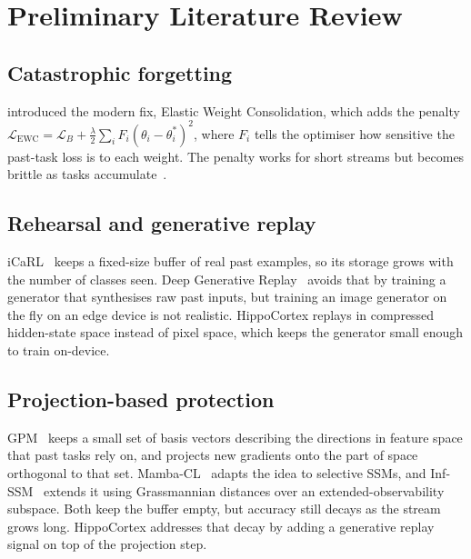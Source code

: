 \documentclass[11pt,a4paper]{article}
\begin{document}
\section{Preliminary Literature Review}

\subsection{Catastrophic forgetting}
\citet{kirkpatrick2017overcoming} introduced the modern fix, Elastic Weight Consolidation, which adds the penalty $\mathcal{L}_{\text{EWC}} = \mathcal{L}_{B} + \tfrac{\lambda}{2}\sum_{i} F_{i}(\theta_{i}-\theta_{i}^{*})^{2}$, where $F_i$ tells the optimiser how sensitive the past-task loss is to each weight. The penalty works for short streams but becomes brittle as tasks accumulate~\citep{delange2022continual}.

\subsection{Rehearsal and generative replay}
iCaRL~\citep{rebuffi2017icarl} keeps a fixed-size buffer of real past examples, so its storage grows with the number of classes seen. Deep Generative Replay~\citep{shin2017continual} avoids that by training a generator that synthesises raw past inputs, but training an image generator on the fly on an edge device is not realistic. HippoCortex replays in compressed hidden-state space instead of pixel space, which keeps the generator small enough to train on-device.

\subsection{Projection-based protection}
GPM~\citep{saha2021gradient} keeps a small set of basis vectors describing the directions in feature space that past tasks rely on, and projects new gradients onto the part of space orthogonal to that set. Mamba-CL~\citep{cheng2024mambacl} adapts the idea to selective SSMs, and Inf-SSM~\citep{lee2025exemplarfree} extends it using Grassmannian distances over an extended-observability subspace. Both keep the buffer empty, but accuracy still decays as the stream grows long. HippoCortex addresses that decay by adding a generative replay signal on top of the projection step.
\end{document}
